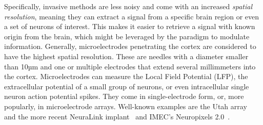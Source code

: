 
Specifically, invasive methods are less noisy and come with an increased \emph{spatial resolution},
meaning they can extract a signal from a specific brain region or even a set of
neurons of interest.
This makes it easier to retrieve a signal with known origin from the brain,
which might be leveraged by the paradigm to modulate information.
Generally, microelectrodes penetrating the cortex are considered to have the highest
spatial resolution.
These are needles with a diameter smaller than 10µm and one or multiple
electrodes that extend several millimmeters into the cortex.
Microelectrodes can measure the Local Field Potential (LFP), the extracellular
potential of a small group of neurons, or even intracellular single neuron
action potential spikes.
They come in single-electrode form, or, more popularly, in microelectrode
arrays.
Well-known examples are the Utah array~\cite{Maynard1997} and the more recent
NeuraLink implant~\cite{Musk2019} and IMEC's Neuropixels
2.0~\cite{Steinmetz2021}.


